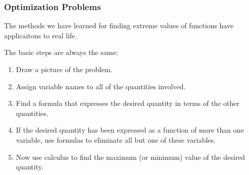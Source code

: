 \begin{frame}
\frametitle{Optimization Problems}
The methods we have learned for finding extreme values of functions have applicaitons to real life.  

The basic steps are always the same:
\begin{enumerate}
\item  Draw a picture of the problem.
\item  Assign variable names to all of the quantities involved.
\item  Find a formula that expresses the desired quantity in terms of the other quantities.
\item  If the desired quantity has been expressed as a function of more than one variable, use formulas to eliminate all but one of these variables.
\item  Now use calculus to find the maximum (or minimum) value of the desired quantity.
\end{enumerate}
\end{frame}
